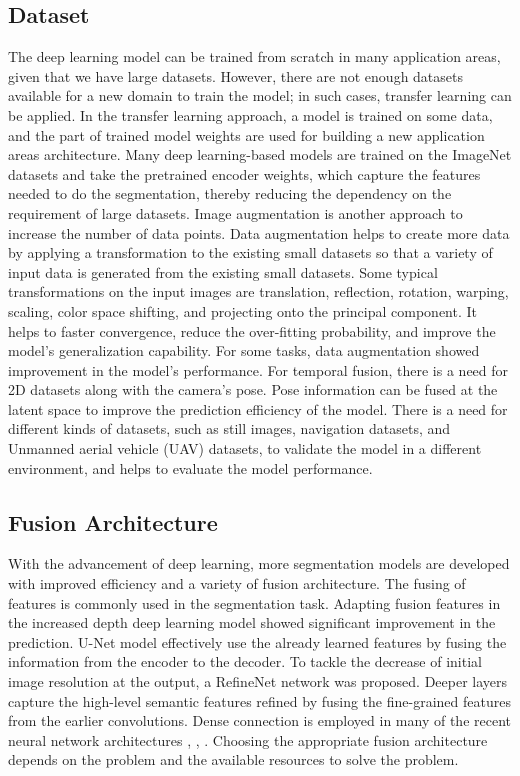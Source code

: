 		
    \subsection{Dataset}
	
	The deep learning model can be trained from scratch in many application areas, given that we have large datasets. However, there are not enough datasets available for a new domain to train the model; in such cases, transfer learning can be applied. In the transfer learning approach, a model is trained on some data, and the part of trained model weights are used for building a new application areas architecture. Many deep learning-based models are trained on the ImageNet datasets and take the pretrained encoder weights, which capture the features needed to do the segmentation, thereby reducing the dependency on the requirement of large datasets. Image augmentation is another approach to increase the number of data points. Data augmentation helps to create more data by applying a transformation to the existing small datasets so that a variety of input data is generated from the existing small datasets. Some typical transformations on the input images are translation, reflection, rotation, warping, scaling, color space shifting, and projecting onto the principal component. It helps to faster convergence, reduce the over-fitting probability, and improve the model's generalization capability. For some tasks, data augmentation showed improvement in the model's performance. For temporal fusion, there is a need for 2D datasets along with the camera's pose. Pose information can be fused at the latent space to improve the prediction efficiency of the model. There is a need for different kinds of datasets, such as still images, navigation datasets, and Unmanned aerial vehicle (UAV) datasets, to validate the model in a different environment, and helps to evaluate the model performance.  

    \subsection{Fusion Architecture}
    
    With the advancement of deep learning, more segmentation models are developed with improved efficiency and a variety of fusion architecture. The fusing of features is commonly used in the segmentation task. Adapting fusion features in the increased depth deep learning model showed significant improvement in the prediction. U-Net \cite{26_ronneberger2015u} model effectively use the already learned features by fusing the information from the encoder to the decoder. To tackle the decrease of initial image resolution at the output, a RefineNet \cite{27_lin2017refinenet} network was proposed. Deeper layers capture the high-level semantic features refined by fusing the fine-grained features from the earlier convolutions. Dense connection is employed in many of the recent neural network architectures \cite{28_jegou2017one}, \cite{29_iandola2014densenet}, \cite{30_yang2018denseaspp}. Choosing the appropriate fusion architecture depends on the problem and the available resources to solve the problem. 


